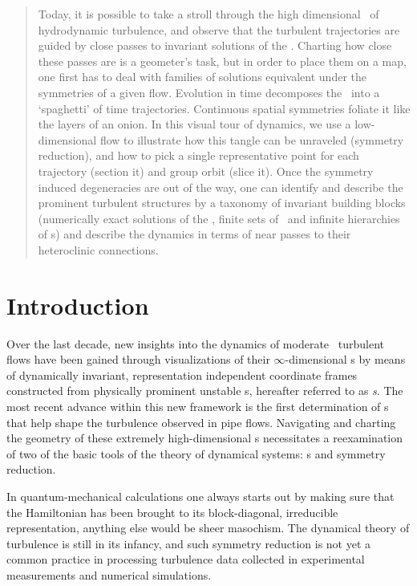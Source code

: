 \documentclass[aip,cha,reprint,
secnumarabic,
nofootinbib, tightenlines,
nobibnotes, showkeys, showpacs,
groupedaddress
]{revtex4-1}
\begin{document}
    \begin{quotation}
Today, it is possible to take a stroll through the high dimensional
\statesp\ of hydrodynamic turbulence, and observe that the turbulent
trajectories are guided by close passes to invariant solutions of the
\NSe. Charting how close these passes are is a geometer's task, but in
order to place them on a map, one first has to deal with families of
solutions equivalent under the symmetries of a given flow. 
Evolution in time decomposes the \statesp\ into a `spaghetti' of time
trajectories. Continuous spatial symmetries foliate it like the layers
of an onion. In this visual tour of dynamics, we use a low-dimensional
flow to illustrate how this tangle can be unraveled (symmetry reduction),
and how to pick a single representative point for each trajectory
(section it) and  group orbit (slice it). Once the symmetry induced
degeneracies are out of the way, one can identify and describe the
prominent turbulent structures by a taxonomy of invariant building
blocks (numerically exact solutions of the \NSe, finite sets of \reqva\
and infinite hierarchies of \rpo s) and describe the dynamics in terms of
near passes to their heteroclinic connections.
    \end{quotation}

\section{Introduction}
\label{s:intro}

Over the last decade, new insights into the dynamics of moderate
\Reynolds\ turbulent flows have been gained through visualizations of
their $\infty$-dimensional \statesp s by means of dynamically invariant,
representation independent coordinate frames\rf{GHCW07} constructed from
physically prominent unstable {\cohStr s}, hereafter referred to as {\em
\template s}.
The most recent advance within this new framework is the first
determination of \rpo s that help shape the turbulence observed in pipe
flows.\rf{ACHKW11} Navigating and charting the geometry of these
extremely high-dimensional \statesp s necessitates a reexamination of two
of the basic tools of the theory of dynamical systems: \PoincSec s and
symmetry reduction.

In quantum-mechanical calculations one always starts out by making sure
that the Hamiltonian has been brought to its block-diagonal, irreducible
representation, anything else would be sheer masochism.
The dynamical theory of turbulence is still in its infancy, and such
symmetry reduction is not yet a common practice in processing  turbulence
data collected in experimental measurements and numerical simulations.
\end{document}
